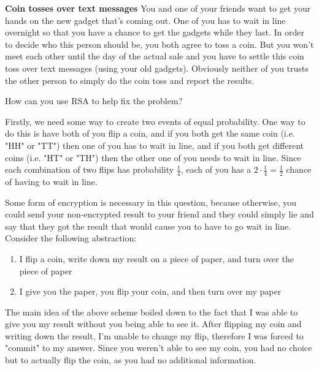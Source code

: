 \question \textbf{Coin tosses over text messages} \newline
You and one of your friends want to get your hands on the new gadget 
that’s coming out. One of you has to wait in line overnight so that 
you have a chance to get the gadgets while they last. In order to 
decide who this person should be, you both agree to toss a coin. But 
you won’t meet each other until the day of the actual sale and you 
have to settle this coin toss over text messages (using your old gadgets). 
Obviously neither of you trusts the other person to simply do the coin 
toss and report the results.\newline
					
How can you use RSA to help fix the problem?	
\begin{solution}
Firstly, we need some way to create two events of equal probability. One way to do this is have both of you flip a coin, and if you both get the same coin (i.e. "HH" or "TT") then one of you has to wait in line, and if you both get different coins (i.e. "HT" or "TH") then the other one of you needs to wait in line. Since each combination of two flips has probability $\frac{1}{4}$, each of you has a $2 \cdot \frac{1}{4} = \frac{1}{2}$ chance of having to wait in line.

Some form of encryption is necessary in this question, because otherwise, you could send your non-encrypted result to your friend and they could simply lie and say that they got the result that would cause you to have to go wait in line. Consider the following abstraction:
\begin{enumerate}
	\item I flip a coin, write down my result on a piece of paper, and turn over the piece of paper
	\item I give you the paper, you flip your coin, and then turn over my paper
\end{enumerate}
The main idea of the above scheme boiled down to the fact that I was able to give you my result without you being able to see it. After flipping my coin and writing down the result, I'm unable to change my flip, therefore I was forced to "commit" to my answer. Since you weren't able to see my coin, you had no choice but to actually flip the coin, as you had no additional information.


\end{solution}
